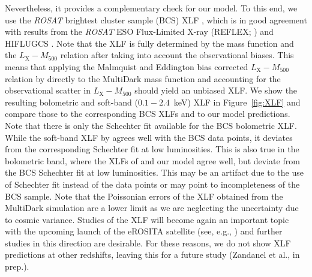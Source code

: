 \documentclass[traditabstract]{aa}
\newcommand{\rmn}{\mathrm}
\begin{document}
Nevertheless, it provides a complementary check for our model. To this end, we
use the \emph{ROSAT} brightest cluster sample (BCS) XLF
\citep{1997ApJ...479L.101E}, which is in good agreement with results from the
\emph{ROSAT} ESO Flux-Limited X-ray (REFLEX; \citealp{2002ApJ...566...93B}) and
HIFLUGCS \citep{2002ApJ...567..716R}.  Note that the XLF is fully determined by
the mass function and the $L_{\rmn{X}}-M_{500}$ relation after taking into
account the observational biases. This means that applying the Malmquist and
Eddington bias corrected $L_{\rmn{X}}-M_{500}$ relation by
\cite{2010MNRAS.406.1773M} directly to the MultiDark mass function and
accounting for the observational scatter in $L_{\rmn{X}}-M_{500}$ should yield
an unbiased XLF. We show the resulting bolometric and soft-band ($0.1-2.4$~keV)
XLF in Figure~\ref{fig:XLF} and compare those to the corresponding BCS XLFs and
to our model predictions. Note that there is only the Schechter fit available
for the BCS bolometric XLF.  While the soft-band XLF by
\cite{2010MNRAS.406.1773M} agrees well with the BCS data points, it deviates
from the corresponding Schechter fit at low luminosities. This is also true in
the bolometric band, where the XLFs of \cite{2010MNRAS.406.1773M} and our model
agree well, but deviate from the BCS Schechter fit at low luminosities. This may
be an artifact due to the use of Schechter fit instead of the data points or may
point to incompleteness of the BCS sample. Note that the Poissonian errors of
the XLF obtained from the MultiDark simulation are a lower limit as we are
neglecting the uncertainty due to cosmic variance.  Studies of the XLF will
become again an important topic with the upcoming launch of the eROSITA
satellite (see, e.g., \citealp{2011MSAIS..17..159C}) and further studies in this
direction are desirable. For these reasons, we do not show XLF predictions at
other redshifts, leaving this for a future study (Zandanel et al., in prep.).
\end{document}
